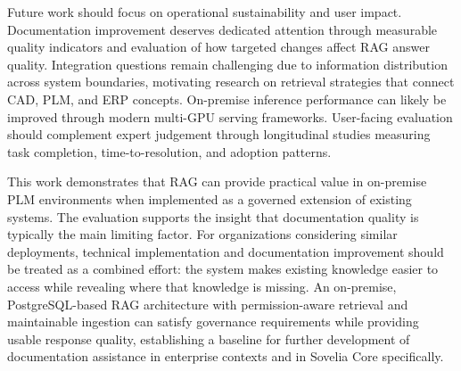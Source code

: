 Future work should focus on operational sustainability and user impact. Documentation improvement deserves dedicated attention through measurable quality indicators and evaluation of how targeted changes affect RAG answer quality. Integration questions remain challenging due to information distribution across system boundaries, motivating research on retrieval strategies that connect CAD, PLM, and ERP concepts. On-premise inference performance can likely be improved through modern multi-GPU serving frameworks. User-facing evaluation should complement expert judgement through longitudinal studies measuring task completion, time-to-resolution, and adoption patterns.

This work demonstrates that RAG can provide practical value in on-premise PLM environments when implemented as a governed extension of existing systems. The evaluation supports the insight that documentation quality is typically the main limiting factor. For organizations considering similar deployments, technical implementation and documentation improvement should be treated as a combined effort: the system makes existing knowledge easier to access while revealing where that knowledge is missing. An on-premise, PostgreSQL-based RAG architecture with permission-aware retrieval and maintainable ingestion can satisfy governance requirements while providing usable response quality, establishing a baseline for further development of documentation assistance in enterprise contexts and in Sovelia Core specifically.
